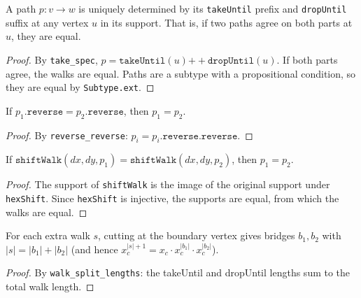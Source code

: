 \begin{lemma}\label{lem:path_determined_by_parts}
\leanok
  A path $p : v \to w$ is uniquely determined by its \texttt{takeUntil} prefix
  and \texttt{dropUntil} suffix at any vertex $u$ in its support.
  That is, if two paths agree on both parts at $u$, they are equal.
\end{lemma}
\begin{proof}
\leanok
  By \texttt{take\_spec}, $p = \texttt{takeUntil}(u) \mathbin{++} \texttt{dropUntil}(u)$.
  If both parts agree, the walks are equal. Paths are a subtype with a
  propositional condition, so they are equal by \texttt{Subtype.ext}.
\end{proof}

\begin{lemma}\label{lem:walk_reverse_injective}
\leanok
  If $p_1.\texttt{reverse} = p_2.\texttt{reverse}$, then $p_1 = p_2$.
\end{lemma}
\begin{proof}
\leanok
  By \texttt{reverse\_reverse}: $p_i = p_i.\texttt{reverse.reverse}$.
\end{proof}

\begin{lemma}\label{lem:shiftWalk_injective}
\leanok
  If $\texttt{shiftWalk}(dx, dy, p_1) = \texttt{shiftWalk}(dx, dy, p_2)$,
  then $p_1 = p_2$.
\end{lemma}
\begin{proof}
\leanok
  The support of \texttt{shiftWalk} is the image of the original support
  under \texttt{hexShift}. Since \texttt{hexShift} is injective, the
  supports are equal, from which the walks are equal.
\end{proof}

\begin{lemma}\label{lem:extraWalk_length_rel}
\leanok
{}
  For each extra walk $s$, cutting at the boundary vertex gives bridges
  $b_1, b_2$ with $|s| = |b_1| + |b_2|$ (and hence
  $x_c^{|s|+1} = x_c \cdot x_c^{|b_1|} \cdot x_c^{|b_2|}$).
\end{lemma}
\begin{proof}
\leanok
  By \texttt{walk\_split\_lengths}: the takeUntil and dropUntil lengths
  sum to the total walk length.
\end{proof}

